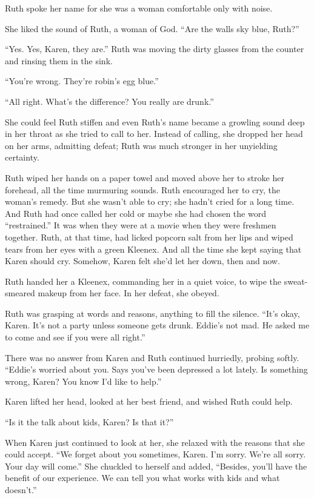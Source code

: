 \documentclass[
]{article}
\begin{document}
Ruth spoke her name for she was a woman comfortable only with noise.

She liked the sound of Ruth, a woman of God. ``Are the walls sky blue,
Ruth?''

``Yes. Yes, Karen, they are.'' Ruth was moving the dirty glasses from
the counter and rinsing them in the sink.

``You're wrong. They're robin's egg blue.''

``All right. What's the difference? You really are drunk.''

She could feel Ruth stiffen and even Ruth's name became a growling sound
deep in her throat as she tried to call to her. Instead of calling, she
dropped her head on her arms, admitting defeat; Ruth was much stronger
in her unyielding certainty.

Ruth wiped her hands on a paper towel and moved above her to stroke her
forehead, all the time murmuring sounds. Ruth encouraged her to cry, the
woman's remedy. But she wasn't able to cry; she hadn't cried for a long
time. And Ruth had once called her cold or maybe she had chosen the word
``restrained.'' It was when they were at a movie when they were freshmen
together. Ruth, at that time, had licked popcorn salt from her lips and
wiped tears from her eyes with a green Kleenex. And all the time she
kept saying that Karen should cry. Somehow, Karen felt she'd let her
down, then and now.

Ruth handed her a Kleenex, commanding her in a quiet voice, to wipe the
sweat-smeared makeup from her face. In her defeat, she obeyed.

Ruth was grasping at words and reasons, anything to fill the silence.
``It's okay, Karen. It's not a party unless someone gets drunk. Eddie's
not mad. He asked me to come and see if you were all right.''

There was no answer from Karen and Ruth continued hurriedly, probing
softly. ``Eddie's worried about you. Says you've been depressed a lot
lately. Is something wrong, Karen? You know I'd like to help.''

Karen lifted her head, looked at her best friend, and wished Ruth could
help.

``Is it the talk about kids, Karen? Is that it?''

When Karen just continued to look at her, she relaxed with the reasons
that she could accept. ``We forget about you sometimes, Karen. I'm
sorry. We're all sorry. Your day will come.'' She chuckled to herself
and added, ``Besides, you'll have the benefit of our experience. We can
tell you what works with kids and what doesn't.''
\end{document}
